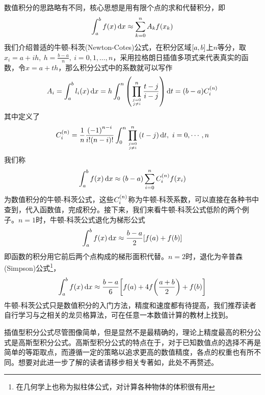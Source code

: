 \documentclass[12pt,a4paper,openany,twoside]{book}
\numberwithin{equation}{section}
\begin{document}
            数值积分的思路略有不同，核心思想是用有限个点的求和代替积分，即
            \begin{equation}
              \int_a^b{f\qty(x)\dd{x}}\approx\sum_{k=0}^n{A_k f\qty(x_k)}
            \end{equation}
            我们介绍普适的牛顿-科茨(Newton-Cotes)公式，在积分区域$\qty[a,b]$上$n$等分，取$x_i=a+ih,\ h=\frac{b-a}{n},\ i=0,1,\dots,n$，采用拉格朗日插值多项式来代表真实的函数，令$x=a+th$，那么积分公式中的系数就可以写作
            \begin{equation}
              A_i=\int_a^b{l_i\qty(x)\dd{x}}=h\int_0^n{\qty(\prod_{j=0 \atop j \neq i}^n{\frac{t-j}{i-j}}) \dd{t}}=\qty(b-a) C_i^\qty(n)
            \end{equation}
            其中定义了
            \begin{equation}
              C_i^\qty(n)=\frac{1}{n} \frac{\qty(-1)^{n-i}}{i !\qty(n-i) !} \int_0^n{\prod_{j=0 \atop j \neq i}^n{\qty(t-j)}\dd{t}},\ i=0,\cdots,n
            \end{equation}
            我们称
            \begin{equation}
              \int_a^b{f\qty(x)\dd{x}}\approx\qty(b-a)\sum_{i=0}^n{C_i^\qty(n)f\qty(x_i)}
            \end{equation}
            为数值积分的牛顿-科茨公式，这些$C_i^\qty(n)$称为牛顿-科茨系数，可以直接在各种书中查到，代入函数值，完成积分。接下来，我们来看牛顿-科茨公式低阶的两个例子。$n=1$时，牛顿-科茨公式退化为梯形公式
            \begin{equation}
              \int_a^b{f\qty(x)\dd{x}}\approx\frac{b-a}{2}\qty[f\qty(a)+f\qty(b)]
            \end{equation}
            即函数的积分用它前后两个点构成的梯形面积代替。$n=2$时，退化为辛普森(Simpson)公式\footnote{在几何学上也称为拟柱体公式，对计算各种物体的体积很有用}，
            \begin{equation}
              \int_a^b{f\qty(x)\dd{x}}\approx\frac{b-a}{6}\qty[f\qty(a)+4f\qty(\frac{a+b}{2})+f\qty(b)]
            \end{equation}
            牛顿-科茨公式只是数值积分的入门方法，精度和速度都有待提高，我们推荐读者自行学习与之相关的龙贝格算法，可在任意一本数值计算的教材上找到。

            插值型积分公式尽管图像简单，但是显然不是最精确的，理论上精度最高的积分公式是高斯型积分公式。高斯型积分公式的特点在于，对于已知数值点的选择不再是简单的等距取点，而遵循一定的策略以追求更高的数值精度，各点的权重也有所不同。想要对此进一步了解的读者请移步相关专著如\cite{numerical_calc_methods}，此处不再赘述。
\end{document}
